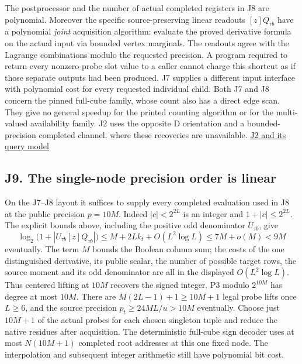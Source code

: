 \documentclass[11pt,a4paper]{article}
\begin{document}
The postprocessor and the number of actual completed registers in J8 are
polynomial. Moreover the specific source-preserving linear readouts
\([z]Q_{\tau b}\) have a polynomial \emph{joint} acquisition algorithm:
evaluate the proved derivative formula on the actual input via bounded
vertex marginals. The readouts agree with the Lagrange combinations
modulo the requested precision. A program required to return every
nonzero-probe slot value to a caller cannot charge this shortcut as if
those separate outputs had been produced. J7 supplies a different input
interface with polynomial cost for every requested individual child.
Both J7 and J8 concern the pinned full-cube family, whose count also has
a direct edge scan. They give no general speedup for the printed
counting algorithm or for the multi-valued availability family. J2 uses
the opposite D orientation and a bounded-precision completed channel,
where these recoveries are unavailable.
\hyperref[v9-section-joint-algorithms]{J2 and its query model}

\subsection{J9. The single-node precision order is
linear}\label{v9-j9-the-single-node-precision-order-is-linear}

On the J7--J8 layout it suffices to supply every completed evaluation
used in J8 at the public precision \(p=10M\). Indeed \(|c|<2^{2L}\) is
an integer and \(1+|c|\le2^{2L}\). The explicit bounds above, including
the positive odd denominator \(U_{\tau b}\), give \[
 \log_2\bigl(1+|U_{\tau b}[z]Q_{\tau b}|\bigr)
       \le M+2L k_t+O(L^2\log L)
       \le 7M+o(M)<9M
\] eventually. The term \(M\) bounds the Boolean column sum; the costs
of the one distinguished derivative, its public scalar, the number of
possible target rows, the source moment and its odd denominator are all
in the displayed \(O(L^2\log L)\). Thus centered lifting at \(10M\)
recovers the signed integer. P3 modulo \(2^{10M}\) has degree at most
\(10M\). There are \(M(2L-1)+1\ge10M+1\) legal probe lifts once
\(L\ge6\), and the source precision \(p_t\ge24ML/u>10M\) eventually.
Choose just \(10M+1\) of the actual probes for each chosen singleton
tuple and reduce the native residues after acquisition. The
deterministic full-cube sign decoder uses at most \textbf{\(N(10M+1)\)}
completed root addresses at this one fixed node. The interpolation and
subsequent integer arithmetic still have polynomial bit cost.
\end{document}
